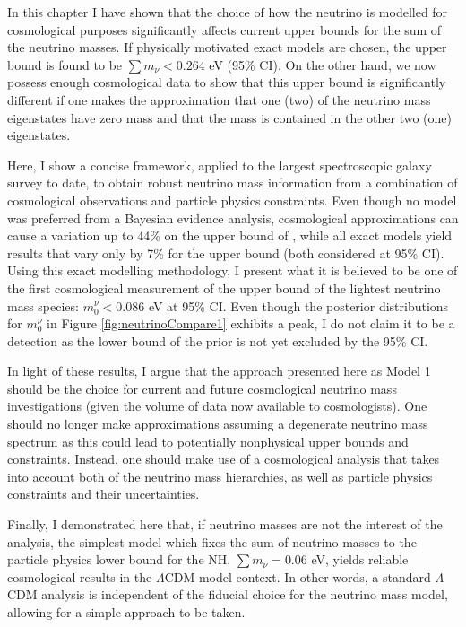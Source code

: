 In this chapter I have shown that the choice of how the neutrino is modelled for cosmological purposes significantly affects current upper bounds for the sum of the neutrino masses. If physically motivated exact models are chosen, the upper bound is found to be $\sum m_{\nu} < 0.264$ eV (95\% CI). On the other hand, we now possess enough cosmological data to show that this upper bound is significantly different if one makes the approximation that one (two) of the neutrino mass eigenstates have zero mass and that the mass is contained in the other two (one) eigenstates. 

\qquad Here, I show a concise framework, applied to the largest spectroscopic galaxy survey to date, to obtain robust neutrino mass information from a combination of cosmological observations and particle physics constraints. Even though no model was preferred from a Bayesian evidence analysis, cosmological approximations can cause a variation up to 44\% on the upper bound of \NM{}, while all exact models yield results that vary only by 7\% for the upper bound (both considered at 95\% CI). Using this exact modelling methodology, I present what it is believed to be one of the first cosmological measurement of the upper bound of the lightest neutrino mass species: $m_{0}^{\nu} < 0.086$ eV at 95\% CI. Even though the posterior distributions for $m_{0}^{\nu}$ in Figure \ref{fig:neutrinoCompare1} exhibits a peak, I do not claim it to be a detection as the lower bound of the prior is not yet excluded by the 95\% CI.

\qquad In light of these results, I argue that the approach presented here as Model 1 should be the choice for current and future cosmological neutrino mass investigations (given the volume of data now available to cosmologists). One should no longer make approximations assuming a degenerate neutrino mass spectrum as this could lead to potentially nonphysical upper bounds and constraints. Instead, one should make use of a cosmological analysis that takes into account both of the neutrino mass hierarchies, as well as particle physics constraints and their uncertainties. 

\qquad Finally, I demonstrated here that, if neutrino masses are not the interest of the analysis, the simplest model which fixes the sum of neutrino masses to the particle physics lower bound for the NH, $\sum m_{\nu} = 0.06$ eV, yields reliable cosmological results in the $\Lambda$CDM model context. In other words, a standard $\Lambda$CDM analysis is independent of the fiducial choice for the neutrino mass model, allowing for a simple approach to be taken.


